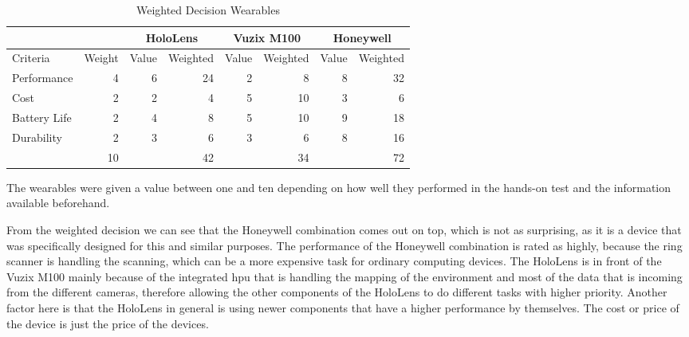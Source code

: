 \begin{table}[htbp]
\centering
\begin{tabular}{|lr|rr|rr|rr|} \hline
             &                            & \multicolumn{2}{c|}{HoloLens}                             & \multicolumn{2}{c|}{Vuzix M100}                           & \multicolumn{2}{c|}{Honeywell}                            \\ \hline
Criteria     & \multicolumn{1}{l|}{Weight} & \multicolumn{1}{l}{Value} & \multicolumn{1}{l|}{Weighted} & \multicolumn{1}{l}{Value} & \multicolumn{1}{l|}{Weighted} & \multicolumn{1}{l}{Value} & \multicolumn{1}{l|}{Weighted} \\
Performance  & 4                          & 6                         & 24                           & 2                         & 8                            & 8                         & 32                           \\
Cost         & 2                          & 2                         & 4                            & 5                         & 10                           & 3                         & 6                            \\
Battery Life & 2                          & 4                         & 8                            & 5                         & 10                           & 9                         & 18                           \\
Durability   & 2                          & 3                         & 6                            & 3                         & 6                            & 8                         & 16                           \\ \hline
             & 10                         &                           & 42                           &                           & 34                           &                           & 72                           \\ \hline
\end{tabular}
\caption{Weighted Decision Wearables}
\label{tab:weightedDecision}
\end{table}

The wearables were given a value between one and ten depending on how well they performed in the hands-on test and the information available beforehand.

From the weighted decision we can see that the Honeywell combination comes out on top, which is not as surprising, as it is a device that was specifically designed for this and similar purposes. The performance of the Honeywell combination is rated as highly, because the ring scanner is handling the scanning, which can be a more expensive task for ordinary computing devices. The HoloLens is in front of the Vuzix M100 mainly because of the integrated \gls{hpu} that is handling the mapping of the environment and most of the data that is incoming from the different cameras, therefore allowing the other components of the HoloLens to do different tasks with higher priority. Another factor here is that the HoloLens in general is using newer components that have a higher performance by themselves. The cost or price of the device is just the price of the devices. 

